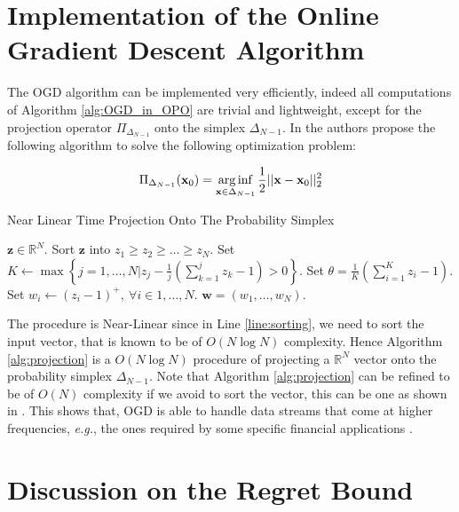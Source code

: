 \section{Implementation of the Online Gradient Descent Algorithm}\label{sec:implementation}

The OGD algorithm can be implemented very efficiently, indeed all computations of Algorithm \ref{alg:OGD_in_OPO} are trivial and lightweight, except for the projection operator $\Pi_{\Delta_{N-1}}$ onto the simplex $\Delta_{N-1}$. In \cite{duchi2008efficient} the authors propose the following algorithm to solve the following optimization problem:

\begin{equation}
\Pi_{\Delta_{N-1}}(\mathbf x_0)=\operatorname*{arg\,inf}\limits_{\mathbf x\in\Delta_{N-1}}\frac{1}{2}||\mathbf x-\mathbf x_0||_2^2
\end{equation}


\begin{algorithm}
    \caption{Near Linear Time Projection Onto The Probability Simplex}
    \label{alg:projection}
    \begin{algorithmic}[1]
    \REQUIRE $\mathbf{z}\in\mathbb R^N.$ \nonumber
    \STATE Sort $\mathbf z$ into $z_1\ge z_2\ge \ldots \ge z_N.$ \label{line:sorting}
    \STATE Set $K\gets\max\left\{j=1,\ldots,N\biggr\rvert z_j-\frac{1}{j}\left(\sum\limits_{k=1}^jz_k-1\right)>0\right\}.$
    \STATE Set $\theta=\frac{1}{K}\left(\sum\limits_{i=1}^Kz_i-1\right).$
    \STATE Set $w_i\gets(z_i-1)^+, \ \forall i\in1,\ldots,N$.
    \RETURN $\mathbf w=(w_1,\ldots,w_N).$
    \end{algorithmic}
\end{algorithm}

The procedure is Near-Linear since in Line \ref{line:sorting}, we need to sort the input vector, that is known to be of $O(N\log N)$ complexity. Hence Algorithm \ref{alg:projection} is a $O(N\log N)$ procedure of projecting a $\mathbb R^N$ vector onto the probability simplex $\Delta_{N-1}$. Note that Algorithm \ref{alg:projection} can be refined to be of $O(N)$ complexity if we avoid to sort the vector, this can be one as shown in \cite{duchi2008efficient}.
This shows that, OGD is able to handle data streams that come at higher frequencies, \emph{e.g.}, the ones required by some specific financial applications \cite{abernethy2013adaptive}.

\section{Discussion on the Regret Bound}

